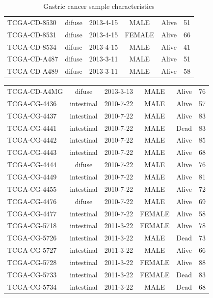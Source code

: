 \documentclass[11pt]{amsart}
\theoremstyle{definition}
\begin{document}
\begin{table}
\begin{center}
\begin{tabular}{lccccc}
TCGA-CD-8530 & difuse & 2013-4-15 & MALE & Alive & 51 \\
TCGA-CD-8531 & difuse & 2013-4-15 & FEMALE & Alive & 66 \\
TCGA-CD-8534 & difuse & 2013-4-15 & MALE & Alive & 41 \\
TCGA-CD-A487 & difuse & 2013-3-11 & MALE & Alive & 51 \\
TCGA-CD-A489 & difuse & 2013-3-11 & MALE & Alive & 58 \\[1em]
\end{tabular}
\caption{Gastric cancer sample characteristics}
\label{tbl:gastric_PartA}
\end{center}
\end{table}


\begin{table}
\begin{center}
\begin{tabular}{lccccc}
TCGA-CD-A4MG & difuse & 2013-3-13 & MALE & Alive & 76 \\
TCGA-CG-4436 & intestinal & 2010-7-22 & MALE & Alive & 57 \\
TCGA-CG-4437 & intestinal & 2010-7-22 & MALE & Alive & 83 \\
TCGA-CG-4441 & intestinal & 2010-7-22 & MALE & Dead & 83 \\
TCGA-CG-4442 & intestinal & 2010-7-22 & MALE & Alive & 85 \\
TCGA-CG-4443 & intestinal & 2010-7-22 & MALE & Alive & 68 \\
TCGA-CG-4444 & difuse & 2010-7-22 & MALE & Alive & 76 \\
TCGA-CG-4449 & intestinal & 2010-7-22 & MALE & Alive & 81 \\
TCGA-CG-4455 & intestinal & 2010-7-22 & MALE & Alive & 72 \\
TCGA-CG-4476 & difuse & 2010-7-22 & MALE & Alive & 69 \\
TCGA-CG-4477 & intestinal & 2010-7-22 & FEMALE & Alive & 58 \\
TCGA-CG-5718 & intestinal & 2011-3-22 & FEMALE & Alive & 78 \\
TCGA-CG-5726 & intestinal & 2011-3-22 & MALE & Dead & 73 \\
TCGA-CG-5727 & intestinal & 2011-3-22 & MALE & Alive & 66 \\
TCGA-CG-5728 & intestinal & 2011-3-22 & FEMALE & Alive & 88 \\
TCGA-CG-5733 & intestinal & 2011-3-22 & FEMALE & Dead & 83 \\
TCGA-CG-5734 & intestinal & 2011-3-22 & MALE & Dead & 68 \\

\end{tabular}
\end{center}
\end{table}
\end{document}
